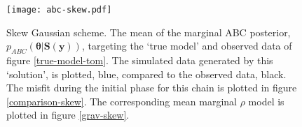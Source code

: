 \begin{figure}[H]
	\centering
	\texttt{[image: abc-skew.pdf]}
	\caption{Skew Gaussian scheme. The mean of the marginal ABC posterior, $p_{ABC}(\bm{\theta}|\bm{S}(\bm{y}))$, targeting the `true model' and observed data of figure \ref{true-model-tom}. The simulated data generated by this `solution', is plotted, blue, compared to the observed data, black. The misfit during the initial phase for this chain is plotted in figure \ref{comparison-skew}. The corresponding mean marginal $\rho$ model is plotted in figure \ref{grav-skew}.}
	\label{tom-skew}
\end{figure}
